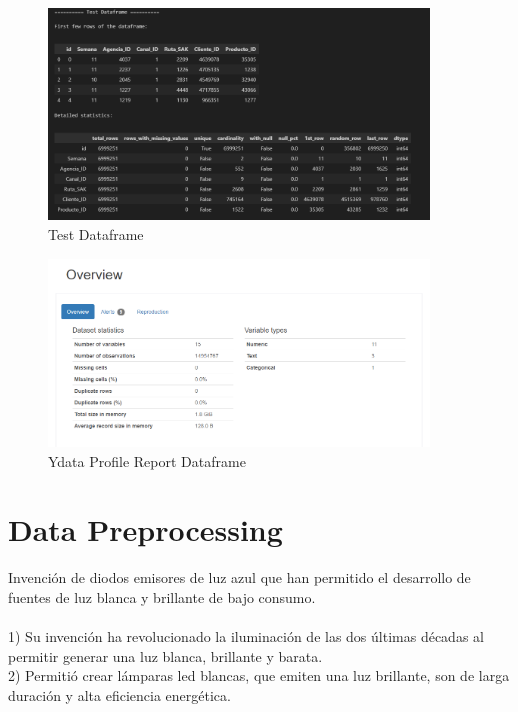 \documentclass{article}
\begin{document}
\begin{figure}[H]
\begin{center}
\centering
\includegraphics[width=0.9\textwidth]{images/test_df.png}
\caption{Test Dataframe}
\end{center}
\end{figure}

\begin{figure}[H] 
\begin{center}
\centering
\includegraphics[width=0.9\textwidth]{images/train_ydata.png}
\caption{Ydata Profile Report Dataframe}
\end{center}
\end{figure}
    

\section{Data Preprocessing}
Invención de diodos emisores de luz azul que han permitido el desarrollo de fuentes de luz blanca y brillante de bajo consumo.\\\\
1) Su invención ha revolucionado la iluminación de las dos últimas décadas al permitir generar una luz blanca, brillante y barata.\\
2) Permitió crear lámparas led blancas, que emiten una luz brillante, son de larga duración y alta eficiencia energética.
\end{document}
